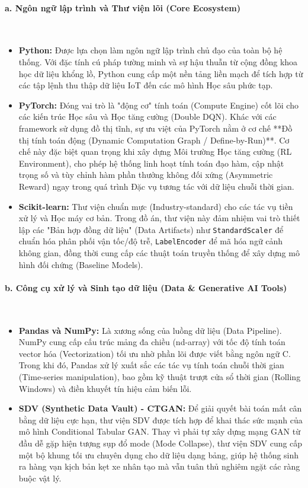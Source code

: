 \paragraph{a. Ngôn ngữ lập trình và Thư viện lõi (Core Ecosystem)} \mbox{} \\
\begin{itemize}
    \item \textbf{Python:} Được lựa chọn làm ngôn ngữ lập trình chủ đạo của toàn bộ hệ thống. Với đặc tính cú pháp tường minh và sự hậu thuẫn từ cộng đồng khoa học dữ liệu khổng lồ, Python cung cấp một nền tảng liền mạch để tích hợp từ các tập lệnh thu thập dữ liệu IoT đến các mô hình Học sâu phức tạp.
    \item \textbf{PyTorch:} Đóng vai trò là "động cơ" tính toán (Compute Engine) cốt lõi cho các kiến trúc Học sâu và Học tăng cường (Double DQN). Khác với các framework sử dụng đồ thị tĩnh, sự ưu việt của PyTorch nằm ở cơ chế **Đồ thị tính toán động (Dynamic Computation Graph / Define-by-Run)**. Cơ chế này đặc biệt quan trọng khi xây dựng Môi trường Học tăng cường (RL Environment), cho phép hệ thống linh hoạt tính toán đạo hàm, cập nhật trọng số và tùy chỉnh hàm phần thưởng không đối xứng (Asymmetric Reward) ngay trong quá trình Đặc vụ tương tác với dữ liệu chuỗi thời gian.
    \item \textbf{Scikit-learn:} Thư viện chuẩn mực (Industry-standard) cho các tác vụ tiền xử lý và Học máy cơ bản. Trong đồ án, thư viện này đảm nhiệm vai trò thiết lập các "Bản hợp đồng dữ liệu" (Data Artifacts) như \texttt{StandardScaler} để chuẩn hóa phân phối vận tốc/độ trễ, \texttt{LabelEncoder} để mã hóa ngữ cảnh không gian, đồng thời cung cấp các thuật toán truyền thống để xây dựng mô hình đối chứng (Baseline Models).
\end{itemize}

\paragraph{b. Công cụ xử lý và Sinh tạo dữ liệu (Data \& Generative AI Tools)} \mbox{} \\
\begin{itemize}
    \item \textbf{Pandas và NumPy:} Là xương sống của luồng dữ liệu (Data Pipeline). NumPy cung cấp cấu trúc mảng đa chiều (nd-array) với tốc độ tính toán vector hóa (Vectorization) tối ưu nhờ phần lõi được viết bằng ngôn ngữ C. Trong khi đó, Pandas xử lý xuất sắc các tác vụ tính toán chuỗi thời gian (Time-series manipulation), bao gồm kỹ thuật trượt cửa sổ thời gian (Rolling Windows) và điền khuyết tín hiệu cảm biến lỗi.
    \item \textbf{SDV (Synthetic Data Vault) - CTGAN:} Để giải quyết bài toán mất cân bằng dữ liệu cực hạn, thư viện SDV được tích hợp để khai thác sức mạnh của mô hình Conditional Tabular GAN. Thay vì phải tự xây dựng mạng GAN từ đầu dễ gặp hiện tượng sụp đổ mode (Mode Collapse), thư viện SDV cung cấp một bộ khung tối ưu chuyên dụng cho dữ liệu dạng bảng, giúp hệ thống sinh ra hàng vạn kịch bản kẹt xe nhân tạo mà vẫn tuân thủ nghiêm ngặt các ràng buộc vật lý.
\end{itemize}

